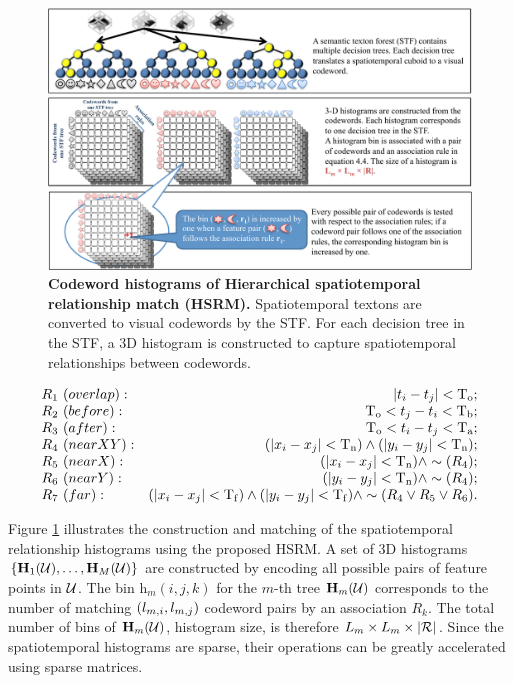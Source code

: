 \begin{figure}[ht]
	\centering	
	\includegraphics[width=1\linewidth]{fig/act/act_hsrm_histogram.pdf} 
	\caption{\textbf{Codeword histograms of Hierarchical spatiotemporal relationship match (HSRM).} Spatiotemporal textons are converted to visual codewords by the STF. For each decision tree in the STF, a 3D histogram is constructed to capture spatiotemporal relationships between codewords.}
	\label{fig/act/hsrm}
\end{figure}


\begin{equation}
	\centering 
	\begin{array}{lr}
		R_{1}~{(overlap)}: & |t_i - t_j| < \mathrm{T_{o}}; \\
		R_{2}~{(before)}: & \mathrm{T_{o}} < t_j - t_i < \mathrm{T_{b}}; \\
		R_{3}~{(after)}: & \mathrm{T_{o}} < t_i - t_j < \mathrm{T_{a}}; \\
		R_{4}~{(near XY)}: & (|x_i - x_j| < \mathrm{T_{n}}) \wedge (|y_i - y_j| < \mathrm{T_{n}}); \\
		R_{5}~{(near X)}: & (|x_i - x_j| < \mathrm{T_{n}}) \wedge \sim(R_{4}); \\
		R_{6}~{(near Y)}: & (|y_i - y_j| < \mathrm{T_{n}}) \wedge \sim(R_{4}); \\
		R_{7}~{(far)}: & (|x_i - x_j| < \mathrm{T_{f}}) \wedge (|y_i - y_j| < \mathrm{T_{f}}) \wedge \sim(R_{4} \vee R_{5} \vee R_{6}).
	\end{array}
	\label{eqn/act/rules}
\end{equation}

Figure \ref{fig/act/hsrm} illustrates the construction and matching of the spatiotemporal relationship histograms using the proposed HSRM. 
A set of 3D histograms $\{ \mathbf{H}_1(\mathcal{U}),\dots,\mathbf{H}_{M}(\mathcal{U})\}$ are constructed by encoding all possible pairs of feature points in $\mathcal{U}$. The bin $\mathrm{h}_{m}(i,j,k)$ for the $m$-th tree $\mathbf{H}_{m}(\mathcal{U})$ corresponds to the number of matching $(l_{m,i},l_{m,j})$ codeword pairs by an association $R_k$. The total number of bins of $\mathbf{H}_m(\mathcal{U})$, \ie histogram size, is therefore $L_m \times L_m \times |\mathcal{R}|$. Since the spatiotemporal histograms are sparse, their operations can be greatly accelerated using sparse matrices.  

